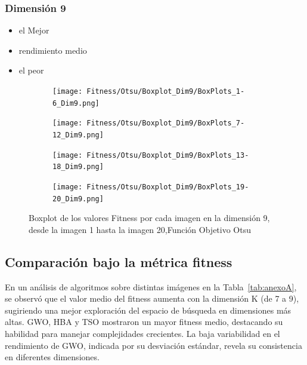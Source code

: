 \documentclass[conference]{IEEEtran}
\begin{document}
\subsubsection{Dimensión 9}
\begin{itemize}
	\item el Mejor
	\item rendimiento medio
	\item el peor
\end{itemize}
\begin{figure}
	\centering
	
	\begin{subfigure}{0.4\textwidth}
		\texttt{[image: Fitness/Otsu/Boxplot\_Dim9/BoxPlots\_1-6\_Dim9.png]}
	\end{subfigure}
	
	\begin{subfigure}{0.4\textwidth}
		\texttt{[image: Fitness/Otsu/Boxplot\_Dim9/BoxPlots\_7-12\_Dim9.png]}
	\end{subfigure}
	\begin{subfigure}{0.4\textwidth}
		\texttt{[image: Fitness/Otsu/Boxplot\_Dim9/BoxPlots\_13-18\_Dim9.png]}
	\end{subfigure}
	\begin{subfigure}{0.4\textwidth}
		\texttt{[image: Fitness/Otsu/Boxplot\_Dim9/BoxPlots\_19-20\_Dim9.png]}
		\vspace{-120pt} %
	\end{subfigure}
	\caption{Boxplot de los valores Fitness por cada imagen en la dimensión 9, desde la imagen 1 hasta la imagen 20,Función Objetivo Otsu}
	\label{fig:imagenes}    
\end{figure}



\subsection{Comparación bajo la métrica fitness}
\noindent En un análisis de algoritmos sobre distintas imágenes en la Tabla~\ref{tab:anexoA}, se observó que el valor medio del fitness aumenta con la dimensión K (de 7 a 9), sugiriendo una mejor exploración del espacio de búsqueda en dimensiones más altas. GWO, HBA y TSO mostraron un mayor fitness medio, destacando su habilidad para manejar complejidades crecientes. La baja variabilidad en el rendimiento de GWO, indicada por su desviación estándar, revela su consistencia en diferentes dimensiones.
\end{document}
